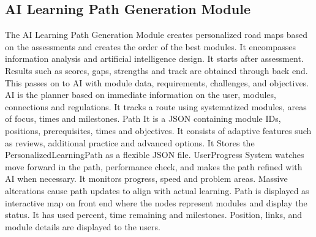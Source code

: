 \documentclass{FastFyp}
\begin{document}
\subsection{AI Learning Path Generation Module}
The AI Learning Path Generation Module creates personalized road maps based on the assessments and creates the order of the best modules. It encompasses information analysis and artificial intelligence design.
It starts after assessment. Results such as scores, gaps, strengths and track are obtained through back end. This passes on to AI with module data, requirements, challenges, and objectives.
AI is the planner based on immediate information on the user, modules, connections and regulations. It tracks a route using systematized modules, areas of focus, times and milestones.
Path It is a JSON containing module IDs, positions, prerequisites, times and objectives. It consists of adaptive features such as reviews, additional practice and advanced options.
It Stores the PersonalizedLearningPath as a flexible JSON file. UserProgress System watches move forward in the path, performance check, and makes the path refined with AI when necessary.
It monitors progress, speed and problem areas. Massive alterations cause path updates to align with actual learning.
Path is displayed as interactive map on front end where the nodes represent modules and display the status. It has used percent, time remaining and milestones. Position, links, and module details are displayed to the users.
\end{document}
